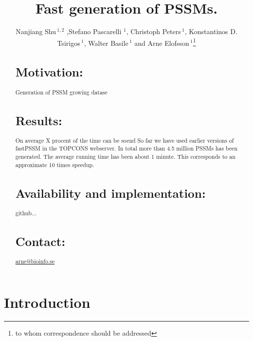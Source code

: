 \documentclass{bioinfo}
\begin{document}

\title[fastPSSM]{Fast generation of PSSMs.}
\author[Shu \textit{et~al}]{Nanjiang Shu\,$^{1,2}$ ,Stefano
  Pascarelli $^{1}$, Christoph Peters\,$^{1}$,  Konstantinos D. Tsirigos\,$^{1}$, 
Walter Basile\,$^{1}$ and Arne Elofsson\,$^{1}$\footnote{to whom correspondence should be addressed}}
\address{$^{1}$Department of Biochemistry and Biophysics, Science for
  Life Laboratory,Stockholm University,
Box 1031, 17121 Solna, Sweden,
$^{2}$Sweden Bioinformatics Infrastructure for Life Sciences (BILS), Stockholm University, Sweden.}


\maketitle

\begin{abstract}
  \section{Motivation:}
  Generation of PSSM growing datase

    \section{Results:}  On average X procent of the time can be soend
So far we have used earlier versions of fastPSSM in the TOPCONS
webserver. In total more than 4.5 million PSSMs has been
generated. The average running time has been about 1 minute. This
corresponds to an approximate 10 times speedup.

  \section{Availability and implementation:}

 github...

  \section{Contact:}
  \href{mailto:arne@bioinfo.se}{arne@bioinfo.se}
\end{abstract}

\section{Introduction}
\end{document}
